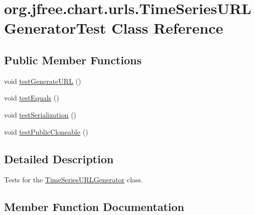 \hypertarget{classorg_1_1jfree_1_1chart_1_1urls_1_1_time_series_u_r_l_generator_test}{}\section{org.\+jfree.\+chart.\+urls.\+Time\+Series\+U\+R\+L\+Generator\+Test Class Reference}
\label{classorg_1_1jfree_1_1chart_1_1urls_1_1_time_series_u_r_l_generator_test}
\subsection*{Public Member Functions}
\begin{DoxyCompactItemize}
\item 
void \mbox{\hyperlink{classorg_1_1jfree_1_1chart_1_1urls_1_1_time_series_u_r_l_generator_test_a85452070b3e8b2e4d850c741c5112ab0}{test\+Generate\+U\+RL}} ()
\item 
void \mbox{\hyperlink{classorg_1_1jfree_1_1chart_1_1urls_1_1_time_series_u_r_l_generator_test_af337dc75bea652158a66074f6293e947}{test\+Equals}} ()
\item 
void \mbox{\hyperlink{classorg_1_1jfree_1_1chart_1_1urls_1_1_time_series_u_r_l_generator_test_ad87a9fdc4ad8115eb15d2e41827b1ccb}{test\+Serialization}} ()
\item 
void \mbox{\hyperlink{classorg_1_1jfree_1_1chart_1_1urls_1_1_time_series_u_r_l_generator_test_a4c173fab3b69fc42ff648eb7cb80920b}{test\+Public\+Cloneable}} ()
\end{DoxyCompactItemize}


\subsection{Detailed Description}
Tests for the \mbox{\hyperlink{classorg_1_1jfree_1_1chart_1_1urls_1_1_time_series_u_r_l_generator}{Time\+Series\+U\+R\+L\+Generator}} class. 

\subsection{Member Function Documentation}
\mbox{\label{classorg_1_1jfree_1_1chart_1_1urls_1_1_time_series_u_r_l_generator_test_af337dc75bea652158a66074f6293e947}} 
